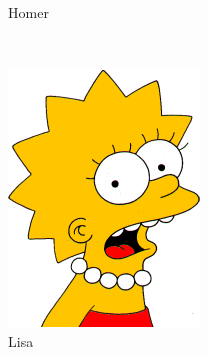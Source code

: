 \documentclass[journal]{IEEEtran}
\begin{document}
\begin{figure}[!htb]
\begin{subfigure}[b]{0.15\textwidth}
        \caption{Homer}
        \label{fig:homer}
    \end{subfigure}
    ~ %
    \begin{subfigure}[b]{0.15\textwidth}
        \includegraphics[width=\textwidth]{lisa001}
        \caption{Lisa}
        \label{fig:lisa}
    \end{subfigure}
    ~ %
    \begin{subfigure}[b]{0.15\textwidth}

\end{subfigure}
\end{figure}
\end{document}
